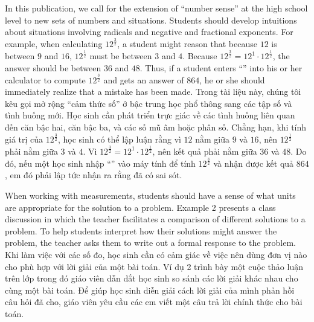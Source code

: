 \documentclass[
  10pt,
  a4paper,
  landscape,
  twoside,
  openany
]{scrbook}
\newcommand{\EN}[1]{#1}
\newcommand{\VI}[1]{#1}
\newcommand{\NOTE}[1]{#1}
\newcounter{example}
\begin{document}
\TriPara
{
\EN{In this publication, we call for the extension of ``number sense'' at the high school level to new sets of numbers and situations. Students should develop intuitions about situations involving radicals and negative and fractional exponents. For example, when calculating $12^\frac{3}{2}$, a student might reason that because $12$ is between $9$ and $16$, $12^\frac{1}{2}$ must be between $3$ and $4$.  Because $12^\frac{3}{2}=12^1\cdot 12^\frac{1}{2}$, the answer should be between $36$ and $48$. Thus, if a student enters ``{\normalfont\detokenize{12^3/2}}'' into his or her calculator to compute $12^\frac{3}{2}$ and gets an answer of $864$, he or she should immediately realize that a mistake has been made.}
}
{
\VI{Trong tài liệu này, chúng tôi kêu gọi mở rộng ``cảm thức số'' ở bậc trung học phổ thông sang các tập số và tình huống mới. Học sinh cần phát triển trực giác về các tình huống liên quan đến căn bậc hai, căn bậc ba, và các số mũ âm hoặc phân số. Chẳng hạn, khi tính giá trị của $12^{\frac{3}{2}}$, học sinh có thể lập luận rằng vì $12$ nằm giữa $9$ và $16$, nên $12^{\frac{1}{2}}$ phải nằm giữa $3$ và $4$. Vì $12^{\frac{3}{2}} = 12^1 \cdot 12^{\frac{1}{2}}$, nên kết quả phải nằm giữa $36$ và $48$. Do đó, nếu một học sinh nhập ``{\normalfont\detokenize{12^3/2}}'' vào máy tính để tính $12^{\frac{3}{2}}$ và nhận được kết quả $864$, em đó phải lập tức nhận ra rằng đã có sai sót.}
}
{
\NOTE{}
}

\TriPara
{
\EN{When working with measurements, students should have a sense of what units are appropriate for the solution to a problem. Example 2 presents a class discussion in which the teacher facilitates a comparison of different solutions to a problem. To help students interpret how their solutions might answer the problem, the teacher asks them to write out a formal response to the problem.}
}
{
\VI{Khi làm việc với các số đo, học sinh cần có cảm giác về việc nên dùng đơn vị nào cho phù hợp với lời giải của một bài toán. Ví dụ 2 trình bày một cuộc thảo luận trên lớp trong đó giáo viên dẫn dắt học sinh so sánh các lời giải khác nhau cho cùng một bài toán. Để giúp học sinh diễn giải cách lời giải của mình phản hồi câu hỏi đã cho, giáo viên yêu cầu các em viết một câu trả lời chính thức cho bài toán.}
}
{
\NOTE{}
}
\end{document}
